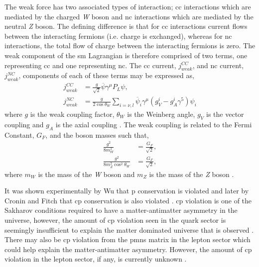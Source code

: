 The weak force has two associated types of interaction; \gls{cc} interactions which are mediated by the charged \textit{W} boson and \gls{nc} interactions which are mediated by the neutral \textit{Z} boson. The defining difference is that for \gls{cc} interactions current flows between the interacting fermions (i.e. charge is exchanged), whereas for \gls{nc} interactions, the total flow of charge between the interacting fermions is zero. The weak component of the \gls{sm} Lagrangian is therefore comprised of two terms, one representing \gls{cc} and one representing \gls{nc}. The \gls{cc} current, $j^{CC}_{weak}$,  and \gls{nc} current, $j^{NC}_{weak}$, components of each of these terms may be expressed as, 
\begin{equation}\label{eqn:weak current}
\begin{split}
    j^{CC}_{weak} &= \frac{g}{\sqrt{2}}\overline{\psi}\gamma^{\mu}P_L\psi, \\
    j^{NC}_{weak} &= \frac{g}{2\cos{\theta_W}}\sum_{i = \nu, l}
    \overline{\psi}_i \gamma^\mu (g_V^i - g_A^i \gamma^5)\psi_i
\end{split}
\end{equation}
where $g$ is the weak coupling factor, $\theta_W$ is the Weinberg angle, $g_V$ is the vector coupling and $g_A$ is the axial coupling \cite{Particles_and_Fundamental_Interactions:_An_Introduction_to_Particle_Physics}\cite{Fundamentals_of_Neutrino_Physics_and_Astrophysics}\cite{PDG_2022}. The weak coupling is related to the Fermi Constant, $G_F$, and the boson masses such that,
\begin{equation}
\begin{split}
    \frac{g^2}{8m^2_W} &= \frac{G_F}{\sqrt{2}}, \\
    \frac{g^2}{8m^2_Z\cos^2{\theta_W}} &= \frac{G_F}{\sqrt{2}},
\end{split}
\end{equation}
where $m_W$ is the mass of the \textit{W} boson and $m_Z$ is the mass of the \textit{Z} boson \cite{Fundamentals_of_Neutrino_Physics_and_Astrophysics}.

It was shown experimentally by Wu that \gls{p} conservation is violated and later by Cronin and Fitch that \gls{cp} conservation is also violated \cite{Wu_experiment}\cite{Cronin_and_Fitch_experiment}. \gls{cp} violation is one of the Sakharov conditions required to have a matter-antimatter asymmetry in the universe, however, the amount of \gls{cp} violation seen in the quark sector is seemingly insufficient to explain the matter dominated universe that is  observed \cite{Sakharov_conditions}. There may also be \gls{cp} violation from the \gls{pmns} matrix in the lepton sector which could help explain the matter-antimatter asymmetry. However, the amount of \gls{cp} violation in the lepton sector, if any, is currently unknown \cite{leptonic_cp_violation}.  


